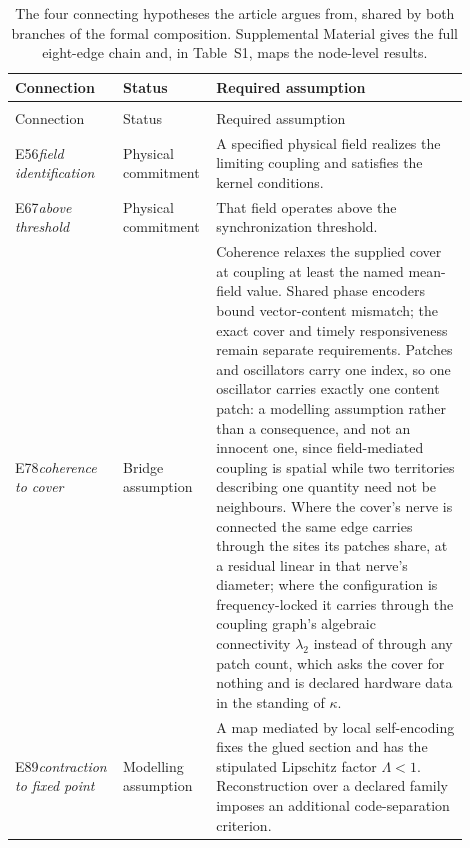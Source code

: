 \documentclass[12pt]{article}
\providecommand{\nolinenumbers}{}
\begin{document}
\begingroup
\nolinenumbers
\singlespacing
\small
\setlength{\LTcapwidth}{\linewidth}
\begin{longtable}{>{\raggedright\arraybackslash}p{0.17\linewidth}>{\raggedright\arraybackslash}p{0.19\linewidth}>{\raggedright\arraybackslash}p{0.54\linewidth}}
\caption{The four connecting hypotheses the article argues from, shared by both branches of the formal composition. Supplemental Material gives the full eight-edge chain and, in Table~S1, maps the node-level results.}
\label{tab:summary}\\
\hline
Connection & Status & Required assumption \\
\hline
\endfirsthead
\multicolumn{3}{l}{\small\itshape Table \thetable\ (continued)}\\
\hline
Connection & Status & Required assumption \\
\hline
\endhead
\hline
\endfoot
E56\newline\textit{field identification} & Physical commitment & A specified physical field realizes the limiting coupling and satisfies the kernel conditions. \\
E67\newline\textit{above threshold} & Physical commitment & That field operates above the synchronization threshold. \\
E78\newline\textit{coherence to cover} & Bridge assumption & Coherence relaxes the supplied cover at coupling at least the named mean-field value. Shared phase encoders bound vector-content mismatch; the exact cover and timely responsiveness remain separate requirements. Patches and oscillators carry one index, so one oscillator carries exactly one content patch: a modelling assumption rather than a consequence, and not an innocent one, since field-mediated coupling is spatial while two territories describing one quantity need not be neighbours. Where the cover's nerve is connected the same edge carries through the sites its patches share, at a residual linear in that nerve's diameter; where the configuration is frequency-locked it carries through the coupling graph's algebraic connectivity $\lambda_2$ instead of through any patch count, which asks the cover for nothing and is declared hardware data in the standing of $\kappa$. \\
E89\newline\textit{contraction to fixed point} & Modelling assumption & A map mediated by local self-encoding fixes the glued section and has the stipulated Lipschitz factor $\Lambda<1$. Reconstruction over a declared family imposes an additional code-separation criterion. \\
\end{longtable}
\endgroup
\end{document}
